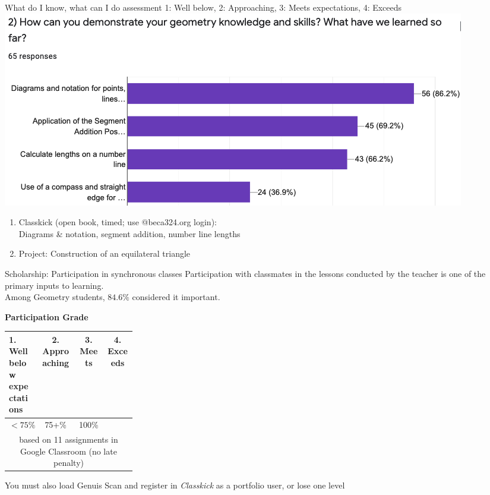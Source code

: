 \begin{frame}{What do I know, what can I do assessment}
  {1: Well below, 2: Approaching, 3: Meets expectations, 4: Exceeds}
  \includegraphics[width=.95\textwidth]{../graphics/know+do-bar-chart.png}
    \begin{enumerate}
      \item Classkick (open book, timed; use @beca324.org login):\\ Diagrams \& notation, segment addition, number line lengths
      \item Project: Construction of an equilateral triangle
    \end{enumerate}
  \end{frame}

\begin{frame}{Scholarship: Participation in synchronous classes}
  Participation with classmates in the lessons conducted by the teacher is one of the primary inputs to learning.\\[0.25cm]
  Among Geometry students, $84.6\%$ considered it important. \vspace{0.5cm}
    \begin{table}[ht]
      \textbf{Participation Grade}
      \begin{tabular}[t]{p{0.25\linewidth} c c c }%
        \hline
        1. Well below \newline expectations & 2. Approaching & 3. Meets & 4. Exceeds \\
        \hline
        \hspace{0.5cm}$<75\%$ & 75+\% & 100\% &  \\[0.25cm]
        \multicolumn{4}{c}{based on 11 assignments in Google Classroom (no late penalty)} \\[0.25cm]
        \hline
      \end{tabular}
  \end{table} \vspace{0.25cm}
  You must also load Genuis Scan and register in \emph{Classkick} as a portfolio user, or lose one level
  \vspace{1cm}
\end{frame}

